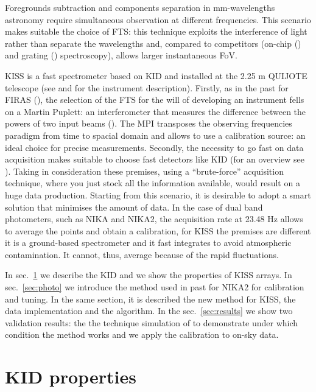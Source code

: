 \documentclass[twocolumn,traditabstract]{aa}\\
\begin{document}
Foregrounds subtraction and components separation in mm-wavelengths astronomy require simultaneous observation at different frequencies. This scenario makes suitable the choice of FTS: this technique exploits the interference of light rather than separate the wavelengths and, compared to competitors (on-chip (\cite{deshima}) and grating (\cite{grating}) spectroscopy), allows larger instantaneous FoV. 

KISS is a fast spectrometer based on KID and installed at the 2.25 m QUIJOTE telescope (see \cite{fasano-ltd} and \cite{fasano-nika2} for the instrument description). Firstly, as in the past for FIRAS (\cite{FIRAS}), the selection of the FTS for the will of developing an instrument fells on a Martin Puplett: an interferometer that measures the difference between the powers of two input beams (\cite{mpi}). The MPI transposes the observing frequencies paradigm from time to spacial domain and allows to use a calibration source: an ideal choice for precise measurements.
Secondly, the necessity to go fast on data acquisition makes suitable to choose fast detectors like KID (for an overview see \cite{kids}). Taking in consideration these premises, using a ``brute-force'' acquisition technique, where you just stock all the information available, would result on a huge data production. Starting from this scenario, it is desirable to adopt a smart solution that minimises the amount of data.
In the case of dual band photometers, such as NIKA and NIKA2, the acquisition rate at 23.48 Hz allows to average the points and obtain a calibration, for KISS the premises are different it is a ground-based spectrometer and it fast integrates to avoid atmospheric contamination. It cannot, thus, average because of the rapid fluctuations.

In sec.~\ref{sec:kid} we describe the KID and we show the properties of KISS arrays. 
In sec.~\ref{sec:photo} we introduce the method used in past for NIKA2 for calibration and tuning. In the same section, it is described the new method for KISS, the data implementation and the algorithm.
In the sec.~\ref{sec:results}  we show two validation results: the the technique simulation of  to demonstrate under which condition the method works and we apply the calibration to on-sky data.

\section{KID properties}
\label{sec:kid}
\end{document}
